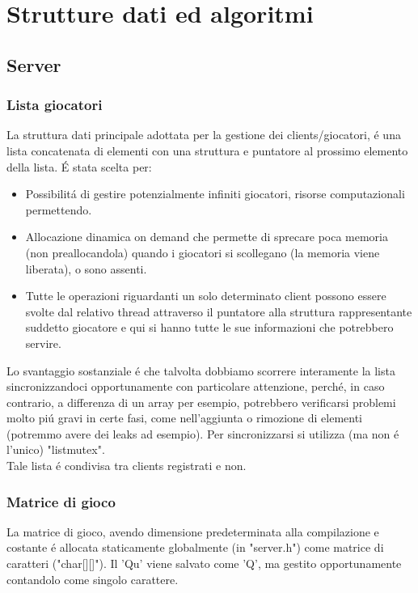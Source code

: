\chapter{Strutture dati ed algoritmi}

\section{Server}

\subsection{Lista giocatori}

La struttura dati principale adottata per la gestione dei clients/giocatori, \'e una lista concatenata di elementi con una struttura e puntatore al prossimo elemento della lista. \'E stata scelta per:

\begin{itemize}
\item Possibilit\'a di gestire potenzialmente infiniti giocatori, risorse computazionali permettendo.
\item Allocazione dinamica on demand che permette di sprecare poca memoria (non preallocandola) quando i giocatori si scollegano (la memoria viene liberata), o sono assenti.
\item Tutte le operazioni riguardanti un solo determinato client possono essere svolte dal relativo thread attraverso il puntatore alla struttura rappresentante suddetto giocatore e qui si hanno tutte le sue informazioni che potrebbero servire.
\end{itemize}
\leavevmode
Lo svantaggio sostanziale \'e che talvolta dobbiamo scorrere interamente la lista sincronizzandoci opportunamente con particolare attenzione, perch\'e, in caso contrario, a differenza di un array per esempio, potrebbero verificarsi problemi molto pi\'u gravi in certe fasi, come nell'aggiunta o rimozione di elementi (potremmo avere dei leaks ad esempio). Per sincronizzarsi si utilizza (ma non \'e l'unico) "listmutex".
\\
Tale lista \'e condivisa tra clients registrati e non.
 \\
 
\subsection{Matrice di gioco}

La matrice di gioco, avendo dimensione predeterminata alla compilazione e costante \'e allocata staticamente globalmente (in "server.h") come matrice di caratteri ("char[][]"). Il 'Qu' viene salvato come 'Q', ma gestito opportunamente contandolo come singolo carattere.
\\


